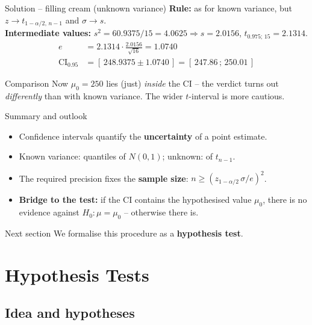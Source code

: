 \documentclass[aspectratio=169,11pt]{beamer}
\begin{document}
\begin{frame}{Solution -- filling cream (unknown variance)}
  \textbf{Rule:} as for known variance, but $z\to t_{1-\alpha/2,\,n-1}$ and
  $\sigma\to s$.\\[2pt]
  \textbf{Intermediate values:} $s^{2} = 60.9375/15 = 4.0625\Rightarrow
  s = 2.0156$, $t_{0.975;\,15} = 2.1314$.
  \begin{align*}
    e &= 2.1314\cdot\frac{2.0156}{\sqrt{16}} = 1.0740\\
    \text{CI}_{0.95} &= [\,248.9375 \pm 1.0740\,]
       = \mathbf{[\,247.86\,;\,250.01\,]}
  \end{align*}
  \begin{exampleblock}{Comparison}
    Now $\mu_0 = 250$ lies (just) \emph{inside} the CI -- the verdict turns out
    \emph{differently} than with known variance. The wider $t$-interval is more
    cautious.
  \end{exampleblock}
\end{frame}

\begin{frame}{Summary and outlook}
  \begin{itemize}\setlength{\itemsep}{4pt}
    \item Confidence intervals quantify the \textbf{uncertainty} of a point
          estimate.
    \item Known variance: quantiles of $N(0,1)$; unknown: of $t_{n-1}$.
    \item The required precision fixes the \textbf{sample size}:
          $n\ge(z_{1-\alpha/2}\,\sigma/e)^2$.
    \item \textbf{Bridge to the test:} if the CI contains the hypothesised
          value $\mu_0$, there is no evidence against $H_0:\mu=\mu_0$ --
          otherwise there is.
  \end{itemize}
  \begin{block}{Next section}
    We formalise this procedure as a \textbf{hypothesis test}.
  \end{block}
\end{frame}
\section[Tests]{Hypothesis Tests}

\subsection{Idea and hypotheses}
\end{document}
